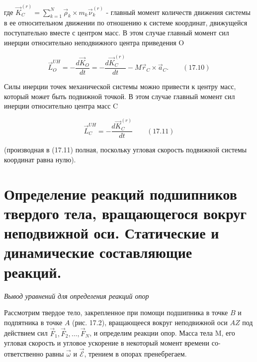 {\begin{center}
	  \par где $ \vec K_C^{(r)} = \sum\limits_{k=1}^N \vec\rho_k \times m_k \vec\nu_k^{(r)}$ - главный момент количеств движения системы в ее относительном движении по отношению к системе координат, движущейся поступательно  вместе  с  центром  масс.  В  этом  случае  главный  момент  сил инерции относительно неподвижного центра приведения O

	  $$ \vec L_O^{UH} = -\frac{d \vec K_O}{dt} = -\frac{d \vec K_C^{(r)}}{dt} - M \vec r_C \times \vec a_C. \qquad (17.10)$$

	  \par Силы инерции  точек  механической системы  можно  привести к  центру масс, который может быть подвижной точкой. В этом случае главный момент сил инерции относительно центра масс C

	  $$ \vec L_C^{UH} = -\frac{d \vec K_C^{(r)}}{dt} \qquad (17.11)$$

	  \par (производная в (17.11) полная, поскольку угловая скорость подвижной системы координат равна нулю).
\end{center}
\section{Определение реакций подшипников твердого тела, вращающегося вокруг неподвижной оси. Статические и динамические составляющие реакций.}
\begin{center}

    \par \textit{Вывод уравнений для определения реакций опор}
    
    \par Рассмотрим твердое тело, закрепленное при помощи подшипника в точке $B$ и подпятника в точке $A$ (рис. 17.2), вращающееся вокруг неподвижной оси $AZ$ под действием сил  $\vec{F}_1, \vec{F}_2, \dots, \vec{F}_N$, и определим реакции опор. Масса тела M, его угловая скорость и угловое ускорение в некоторый момент времени со-ответственно равны $\vec{\omega}$ и $\vec{\mathcal{E}}$, трением в опорах пренебрегаем.
    

\end{center}}
